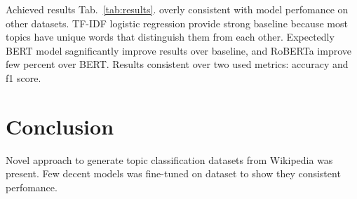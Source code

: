 \documentclass{article}
\begin{document}
Achieved results Tab.~\ref{tab:results}. overly consistent with model perfomance on other datasets. TF-IDF logistic regression provide strong baseline because most topics have unique words that distinguish them from each other. Expectedly BERT model sagnificantly improve results over baseline, and RoBERTa improve
few percent over BERT. Results consistent over two used metrics: accuracy and f1 score.

\section{Conclusion}
Novel approach to generate topic classification datasets from Wikipedia was present. Few decent models was fine-tuned on dataset to show they consistent perfomance.



\end{document}
